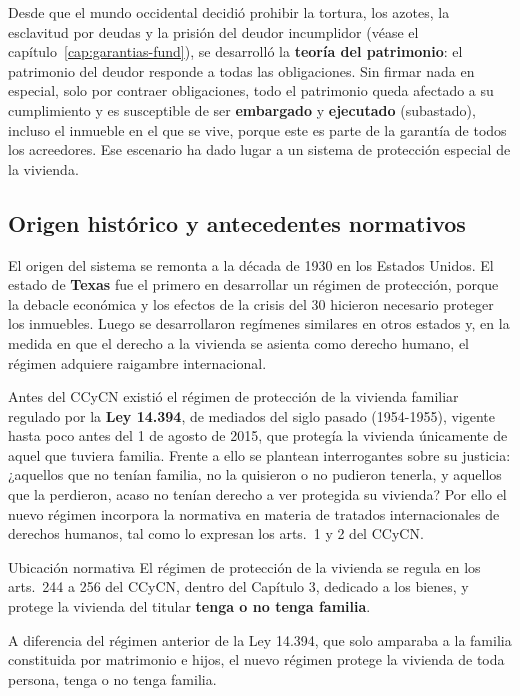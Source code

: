\documentclass[12pt,oneside]{book}
\begin{document}
Desde que el mundo occidental decidió prohibir la tortura, los azotes, la esclavitud por deudas y la prisión del deudor incumplidor (véase el capítulo~\ref{cap:garantias-fund}), se desarrolló la \textbf{teoría del patrimonio}: el patrimonio del deudor responde a todas las obligaciones. Sin firmar nada en especial, solo por contraer obligaciones, todo el patrimonio queda afectado a su cumplimiento y es susceptible de ser \textbf{embargado} y \textbf{ejecutado} (subastado), incluso el inmueble en el que se vive, porque este es parte de la garantía de todos los acreedores. Ese escenario ha dado lugar a un sistema de protección especial de la vivienda.

\subsection{Origen histórico y antecedentes normativos}

El origen del sistema se remonta a la década de 1930 en los Estados Unidos. El estado de \textbf{Texas} fue el primero en desarrollar un régimen de protección, porque la debacle económica y los efectos de la crisis del 30 hicieron necesario proteger los inmuebles. Luego se desarrollaron regímenes similares en otros estados y, en la medida en que el derecho a la vivienda se asienta como derecho humano, el régimen adquiere raigambre internacional.

Antes del CCyCN existió el régimen de protección de la vivienda familiar regulado por la \textbf{Ley 14.394}, de mediados del siglo pasado (1954-1955), vigente hasta poco antes del 1 de agosto de 2015, que protegía la vivienda únicamente de aquel que tuviera familia. Frente a ello se plantean interrogantes sobre su justicia: ¿aquellos que no tenían familia, no la quisieron o no pudieron tenerla, y aquellos que la perdieron, acaso no tenían derecho a ver protegida su vivienda? Por ello el nuevo régimen incorpora la normativa en materia de tratados internacionales de derechos humanos, tal como lo expresan los arts.~1 y 2 del CCyCN.

\begin{definicion}{Ubicación normativa}
El régimen de protección de la vivienda se regula en los arts.~244 a 256 del CCyCN, dentro del Capítulo 3, dedicado a los bienes, y protege la vivienda del titular \textbf{tenga o no tenga familia}.
\end{definicion}

\begin{importante}
A diferencia del régimen anterior de la Ley 14.394, que solo amparaba a la familia constituida por matrimonio e hijos, el nuevo régimen protege la vivienda de toda persona, tenga o no tenga familia.
\end{importante}
\end{document}
